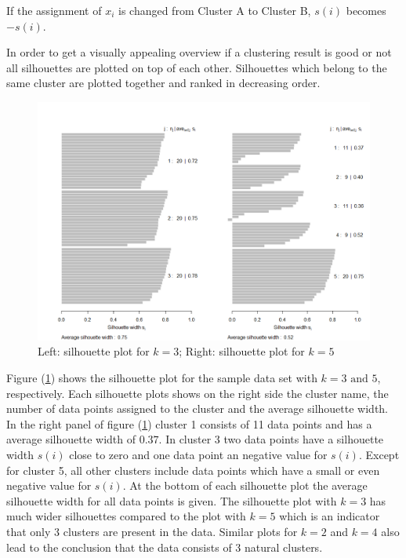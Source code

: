 \begin{remark}
	If the assignment of $x_i$ is changed from Cluster A to Cluster B, $s (i)$ becomes $-s (i)$.
\end{remark}
In order to get a visually appealing overview if a clustering result is good or not all silhouettes are plotted on top of each other. Silhouettes which belong to the same cluster are plotted together and ranked in decreasing order.

\begin{figure}
	\centering
	\includegraphics[width=\textwidth]{figures/chapter_k_means/silhouette}
	\caption{Left: silhouette plot for $k=3$; Right: silhouette plot for $k=5$}
	\label{fig:silhouette}
\end{figure}

Figure (\ref{fig:silhouette}) shows the silhouette plot for the sample data set with $k=3 \text{ and } 5$, respectively. Each silhouette plots shows on the right side the cluster name, the number of data points assigned to the cluster and the average silhouette width. In the right panel of figure (\ref{fig:silhouette}) cluster 1 consists of 11 data points and has a average silhouette width of $0.37$. In cluster 3 two data points have a silhouette width $s(i)$ close to zero and one data point an negative value for $s(i)$. Except for cluster 5, all other clusters include data points which have a small or even negative value for $s(i)$. At the bottom of each silhouette plot the average silhouette width for all data points is given. The silhouette plot with $k=3$ has much wider silhouettes compared to the plot with $k=5$ which is an indicator that only 3 clusters are present in the data. Similar plots for $k=2$ and $k=4$ also lead to the conclusion that the data consists of 3 natural clusters. 

